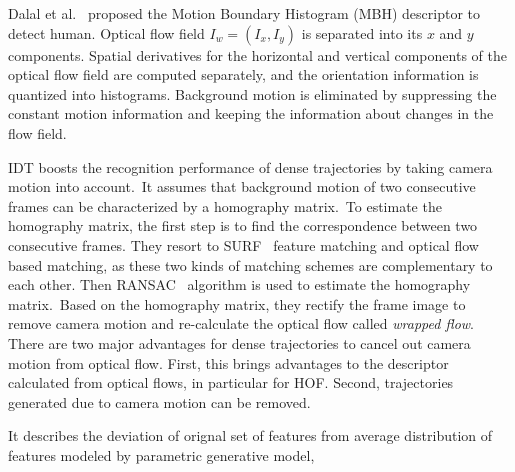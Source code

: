 Dalal et al.~\cite{dalal2006human} proposed the Motion Boundary Histogram (MBH) descriptor to detect human. Optical flow field $I_{w} = (I_{x}, I_{y})$ is separated into its $x$ and $y$ components. Spatial derivatives for the horizontal and vertical components of the optical flow field are computed separately, and the orientation information is quantized into histograms. Background motion is eliminated by suppressing the constant motion information and keeping the information about changes in the flow field.   

IDT boosts the recognition performance of dense trajectories by taking camera motion into account.\ It assumes that background motion of two consecutive frames can be characterized by a homography matrix.\ To estimate the homography matrix, the first step is to find the correspondence between two consecutive frames. They resort to SURF~\cite{bay2008} feature matching and optical flow based matching, as these two kinds of matching schemes are complementary to each other. Then RANSAC~\cite{fischler1981random} algorithm is used to estimate the homography matrix.\ Based on the homography matrix, they rectify the frame image to remove camera motion and re-calculate the optical flow called \textit{wrapped flow}. There are two major advantages for dense trajectories to cancel out camera motion from optical flow. First, this brings advantages to the descriptor calculated from optical flows, in particular for HOF. Second, trajectories generated due to camera motion can be removed.

It describes the deviation of orignal set of features from average distribution of features modeled by parametric generative model, 
